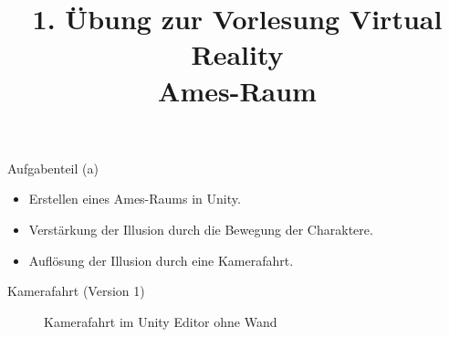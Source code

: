 \documentclass{beamer}
\author[Jan Niclas Ruppenthal, Michael Feldmann, Philipp Geier]{}
\title[]{1. Übung zur Vorlesung
Virtual Reality\\ Ames-Raum}
\institute[Universität Trier]{}
\date[06. Mai 2024]{}
\begin{document}
{
  \begin{frame}
    \maketitle
  \end{frame}
}
    
	


\begin{frame}{Aufgabenteil (a)}
\begin{itemize}
\item Erstellen eines Ames-Raums in Unity.
\item Verstärkung der Illusion durch die Bewegung der Charaktere.
\item Auflösung der Illusion durch eine Kamerafahrt.
\end{itemize}
\end{frame}

\begin{frame}{Kamerafahrt (Version 1)}
\begin{figure}
    \centering
\caption{Kamerafahrt im Unity Editor ohne Wand}
\end{figure}
\end{frame}
\end{document}
